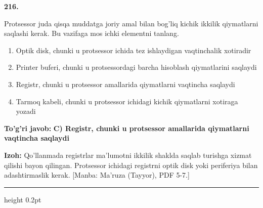 \documentclass[10pt,a4paper]{article}
\begin{document}
{\bfseries\sffamily\color{ink} 216.}
\par
Protsessor juda qisqa muddatga joriy amal bilan bog'liq kichik ikkilik qiymatlarni saqlashi kerak. Bu vazifaga mos ichki elementni tanlang.
\begin{enumerate}[label=\Alph*),leftmargin=9mm]
\item Optik disk, chunki u protsessor ichida tez ishlaydigan vaqtinchalik xotiradir
\item Printer buferi, chunki u protsessordagi barcha hisoblash qiymatlarini saqlaydi
\item Registr, chunki u protsessor amallarida qiymatlarni vaqtincha saqlaydi
\item Tarmoq kabeli, chunki u protsessor ichidagi kichik qiymatlarni xotiraga yozadi
\end{enumerate}
\begin{tcolorbox}[enhanced,breakable,colback=teal!4,colframe=teal!60!black,boxrule=0.45pt,arc=1.2mm,left=2.7mm,right=2.7mm,top=1.8mm,bottom=1.8mm,before skip=2mm,after skip=2mm]
{\bfseries\sffamily\color{teal}To'g'ri javob:} \textbf{C) Registr, chunki u protsessor amallarida qiymatlarni vaqtincha saqlaydi}
\par\smallskip
{\bfseries Izoh:} Qo'llanmada registrlar ma'lumotni ikkilik shaklda saqlab turishga xizmat qilishi bayon qilingan. Protsessor ichidagi registrni optik disk yoki periferiya bilan adashtirmaslik kerak. [Manba: Ma'ruza (Tayyor), PDF 5-7.]
\end{tcolorbox}
\vspace{2mm}\hrule height 0.2pt\vspace{3mm}
\end{document}
